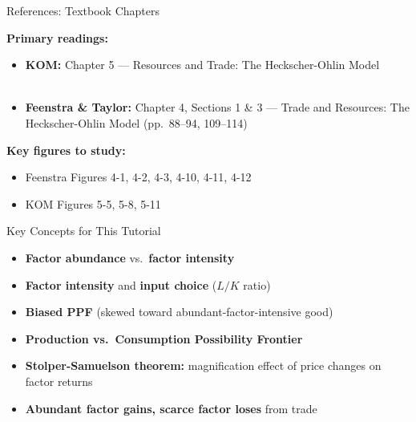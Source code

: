 \documentclass{beamer}
\begin{document}

\begin{frame}{References: Textbook Chapters}

\textbf{Primary readings:}
\begin{itemize}
    \item \textbf{KOM:} Chapter 5 --- Resources and Trade: The Heckscher-Ohlin Model \\~\\
    \item \textbf{Feenstra \& Taylor:} Chapter 4, Sections 1 \& 3 --- Trade and Resources: The Heckscher-Ohlin Model (pp.\ 88--94, 109--114)
\end{itemize}

\vspace{0.5cm}

\textbf{Key figures to study:}
\begin{itemize}
    \item Feenstra Figures 4-1, 4-2, 4-3, 4-10, 4-11, 4-12
    \item KOM Figures 5-5, 5-8, 5-11
\end{itemize}

\end{frame}


\begin{frame}{Key Concepts for This Tutorial}

\begin{itemize}
    \item \textbf{Factor abundance} vs.\ \textbf{factor intensity}
    
    \vspace{0.3cm}
    
    \item \textbf{Factor intensity} and \textbf{input choice} ($L/K$ ratio)
    
    \vspace{0.3cm}
    
    \item \textbf{Biased PPF} (skewed toward abundant-factor-intensive good)
    
    \vspace{0.3cm}
    
    \item \textbf{Production vs.\ Consumption Possibility Frontier}
    
    \vspace{0.3cm}
    
    \item \textbf{Stolper-Samuelson theorem:} magnification effect of price changes on factor returns
    
    \vspace{0.3cm}
    
    \item \textbf{Abundant factor gains, scarce factor loses} from trade
\end{itemize}

\end{frame}
\end{document}
